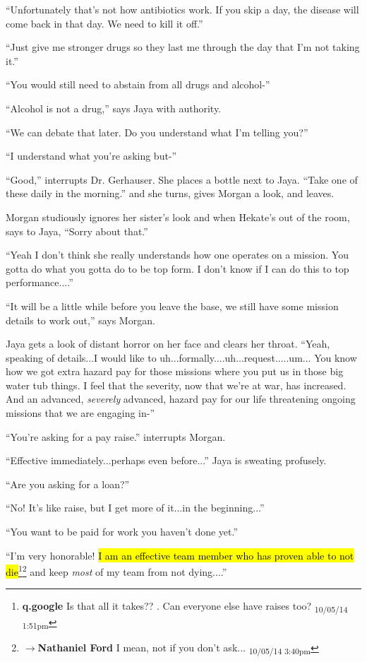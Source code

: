 ``Unfortunately that's not how antibiotics work.  If you skip a day, the disease will come back in that day.  We need to kill it off.''

``Just give me stronger drugs so they last me through the day that I'm not taking it.''

``You would still need to abstain from all drugs and alcohol-''

``Alcohol is not a drug,'' says Jaya with authority.

``We can debate that later.  Do you understand what I'm telling you?''

``I understand what you're asking but-''

``Good,'' interrupts Dr. Gerhauser.  She places a bottle next to Jaya.  ``Take one of these daily in the morning.''  and she turns, gives Morgan a look, and leaves.

Morgan studiously ignores her sister's look and when Hekate's out of the room, says to Jaya, ``Sorry about that.''

``Yeah I don't think she really understands how one operates on a mission.  You gotta do what you gotta do to be top form.  I don't know if I can do this to top performance....''

``It will be a little while before you leave the base, we still have some mission details to work out,'' says Morgan.

Jaya gets a look of distant horror on her face and clears her throat. ``Yeah, speaking of details...I would like to uh...formally....uh...request.....um... You know how we got extra hazard pay for those missions where you put us in those big water tub things.  I feel that the severity, now that we're at war, has increased.  And an advanced, \textit{severely} advanced, hazard pay for our life threatening ongoing missions that we are engaging in-''

``You're asking for a pay raise.'' interrupts Morgan.

``Effective immediately...perhaps even before...'' Jaya is sweating profusely.

``Are you asking for a loan?''

``No!  It's like raise, but I get more of it...in the beginning...''

``You want to be paid for work you haven't done yet.''

``I'm very honorable!  \hl{I am an effective team member who has proven able to not die}\footnote{\textbf{q.google }Is that all it takes??  .  Can everyone else have raises too? \textsubscript{10/05/14 1:51pm}}\footnote{$\rightarrow$\textbf{Nathaniel Ford }I mean, not if you don't ask... \textsubscript{10/05/14 3:40pm}} and keep \textit{most} of my team from not dying....''

